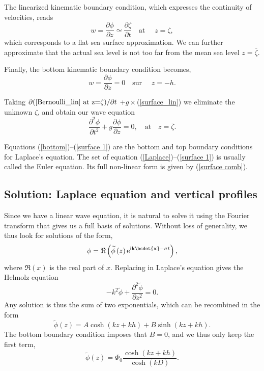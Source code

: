 The linearized kinematic boundary condition, which expresses the continuity of velocities, reads
\begin{equation}
    w = \frac{\partial \phi }{\partial z} \simeq \frac{\partial \zeta}{\partial t}
    \quad \mbox{at\ }\quad z=\zeta,  \label{surface_lin}
\end{equation} which corresponds to a flat sea surface approximation. 
We can further approximate that the actual sea level is not too far from the mean sea level $z=\overline{\zeta}$. 


Finally, the bottom kinematic boundary condition becomes, 
\begin{equation}
    w=\frac{\partial \phi }{\partial z}=0 \quad \mbox{sur\ }\quad z=-h.  \label{bottom}
\end{equation}

Taking  $\partial (\ref{Bernoulli_lin} \textrm{~at z=}\zeta)/\partial t $
+$g\times$(\ref{surface_lin}) we eliminate the unknown $\zeta$, and obtain our 
wave equation 
\begin{equation}
  \frac{\partial^2{\phi}}{\partial{t^2}}+g\frac{\partial\phi}{\partial z}=0, \quad \mbox{at}
\quad  z=\overline{\zeta}. \label{surface 1}
\end{equation}

Equations (\ref{bottom})--(\ref{surface 1}) are the bottom and top boundary conditions for Laplace's equation. The 
set of equation  (\ref{Laplace})--(\ref{surface 1}) is
usually called the Euler equation. Its full non-linear form is given by (\ref{surface comb}). 
 
\subsection{Solution: Laplace equation and vertical profiles}
Since we have a linear wave equation, it is natural to solve it 
using the Fourier transform that gives us a full basis of solutions. Without loss of generality, 
we thus look for solutions of the form, 
\begin{equation}
    \phi=\Re \left(\widetilde{\phi}\left(z\right)
     \mathrm{e}^{\mathrm{i}{\mathbf k}\bcdot{\mathbf x} - \sigma t} \right),
    \label{phi1}
\end{equation}
where $\Re(x)$ is the real part of $x$. Replacing in Laplace's equation gives the Helmolz equation 
\begin{equation}
    -k^2 \widetilde{\phi}+\frac{\partial^2 \widetilde{\phi}}{\partial z^2}=0.
    \label{Helmholz}
\end{equation}
Any solution is thus the sum of two exponentials, which can be recombined in the form 
\begin{equation}
    \widetilde{\phi}(z)=A \cosh\left(kz+kh \right)
        + B \sinh\left(kz+kh \right).
\end{equation}
The bottom boundary condition imposes that $B=0$, and we thus only keep the first term,
\begin{equation}
    \widetilde{\phi}\left(z\right)=\Phi_0
    \frac{\cosh\left(kz+kh\right)}{\cosh\left(kD\right)}.
    \label{cosh}
\end{equation}

